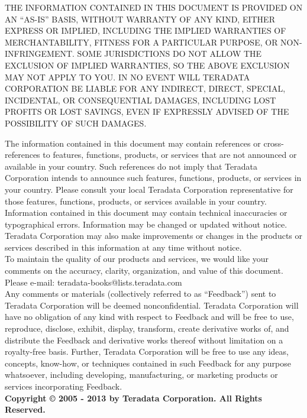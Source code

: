 \begin{bf}THE INFORMATION CONTAINED IN THIS DOCUMENT IS PROVIDED ON AN “AS-IS” BASIS, WITHOUT WARRANTY OF ANY KIND, EITHER
EXPRESS OR IMPLIED, INCLUDING THE IMPLIED WARRANTIES OF MERCHANTABILITY, FITNESS FOR A PARTICULAR PURPOSE, OR
NON-INFRINGEMENT. SOME JURISDICTIONS DO NOT ALLOW THE EXCLUSION OF IMPLIED WARRANTIES, SO THE ABOVE EXCLUSION
MAY NOT APPLY TO YOU. IN NO EVENT WILL TERADATA CORPORATION BE LIABLE FOR ANY INDIRECT, DIRECT, SPECIAL, INCIDENTAL,
OR CONSEQUENTIAL DAMAGES, INCLUDING LOST PROFITS OR LOST SAVINGS, EVEN IF EXPRESSLY ADVISED OF THE POSSIBILITY OF
SUCH DAMAGES.\\
\end{bf}


\begin{small}
The information contained in this document may contain references or cross-references to features, functions, products, or services that are
not announced or available in your country. Such references do not imply that Teradata Corporation intends to announce such features,
functions, products, or services in your country. Please consult your local Teradata Corporation representative for those features, functions,
products, or services available in your country.\\
Information contained in this document may contain technical inaccuracies or typographical errors. Information may be changed or updated
without notice. Teradata Corporation may also make improvements or changes in the products or services described in this information at any
time without notice.\\
To maintain the quality of our products and services, we would like your comments on the accuracy, clarity, organization, and value of this
document. Please e-mail: teradata-books@lists.teradata.com\\
Any comments or materials (collectively referred to as “Feedback”) sent to Teradata Corporation will be deemed non\-confidential. Teradata
Corporation will have no obligation of any kind with respect to Feedback and will be free to use, reproduce, disclose, exhibit, display, transform,
create derivative works of, and distribute the Feedback and derivative works thereof without limitation on a royalty-free basis. Further, Teradata
Corporation will be free to use any ideas, concepts, know-how, or techniques contained in such Feedback for any purpose whatsoever, including
developing, manufacturing, or marketing products or services incorporating Feedback.\\
\bf{Copyright © 2005 - 2013 by Teradata Corporation. All Rights Reserved.}
\end{small}
